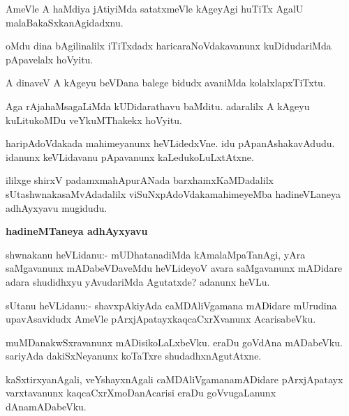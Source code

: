 \begin{mng}
AmeVle A haMdiya jAtiyiMda satatxmeVle kAgeyAgi huTiTx AgalU malaBakaSxkanAgidadxnu.
\end{mng}

\begin{mng}
oMdu dina bAgilinalilx iTiTxdadx haricaraNoVdakavanunx kuDidudariMda pApavelalx hoVyitu.
\end{mng}

\begin{mng}
A dinaveV A kAgeyu beVDana balege bidudx avaniMda kolalxlapxTiTxtu.
\end{mng}

\begin{mng}
Aga rAja{ha}MsagaLiMda kUDidarathavu baMditu. adaralilx A kAgeyu kuLitukoMDu veYkuMThakekx hoVyitu.
\end{mng}

\begin{mng}
haripAdoVdakada mahimeyanunx heVLidedxVne. idu pApanAshakavAdudu. idanunx keVLidavanu pApavanunx kaLedukoLuLxtAtxne.
\end{mng}
ililxge shirxV padamxmahApurANada barxhamxKaMDadalilx sUtashwnakasaMvAdadalilx viSuNxpAdoVdakamahimeyeMba hadineVLaneya adhAyxyavu mugidudu.

\begin{center}
\textbf{\large hadineMTaneya adhAyxyavu}
\end{center}

\begin{mng}
shwnakanu heVLidanu:- mUDhatanadiMda kAmalaMpaTanAgi, yAra saMgavanunx mADabeVDaveMdu heVLideyoV avara saMgavanunx mADidare adara shudidhxyu yAvudariMda Agutatxde? adanunx heVLu.
\end{mng}

\begin{mng}
sUtanu heVLidanu:- shavxpAkiyAda caMDAliVgamana mADidare mUrudina upavAsavidudx AmeVle pArxjApatayxkaqcaCxrXvanunx AcarisabeVku.
\end{mng}

\begin{mng}
muMDanakwSxravanunx mADisikoLaLxbeVku. eraDu goVdAna mADabeVku. sariyAda dakiSxNeyanunx koTaTxre shudadhxnAgutAtxne.
\end{mng}

\begin{mng}
kaSxtirxyanAgali, veYshayxnAgali caMDAliVgamanamADidare pArxjApatayx varxtavanunx kaqcaCxrXmoDanAcarisi eraDu goVvugaLanunx dAnamADabeVku.
\end{mng}

